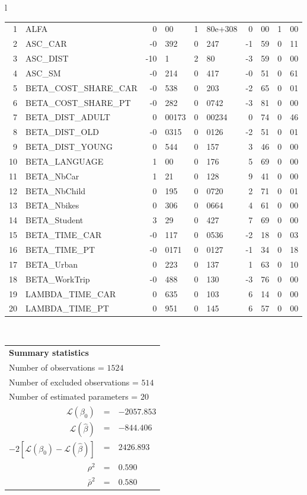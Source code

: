 \begin{tabular}{l}
\begin{tabular}{rlr@{.}lr@{.}lr@{.}lr@{.}l}
1 & ALFA & 0&00 & 1&80e+308 & 0&00 & 1&00\\
2 & ASC_CAR & -0&392 & 0&247 & -1&59 & 0&11\\
3 & ASC_DIST & -10&1 & 2&80 & -3&59 & 0&00\\
4 & ASC_SM & -0&214 & 0&417 & -0&51 & 0&61\\
5 & BETA_COST_SHARE_CAR & -0&538 & 0&203 & -2&65 & 0&01\\
6 & BETA_COST_SHARE_PT & -0&282 & 0&0742 & -3&81 & 0&00\\
7 & BETA_DIST_ADULT & 0&00173 & 0&00234 & 0&74 & 0&46\\
8 & BETA_DIST_OLD & -0&0315 & 0&0126 & -2&51 & 0&01\\
9 & BETA_DIST_YOUNG & 0&544 & 0&157 & 3&46 & 0&00\\
10 & BETA_LANGUAGE & 1&00 & 0&176 & 5&69 & 0&00\\
11 & BETA_NbCar & 1&21 & 0&128 & 9&41 & 0&00\\
12 & BETA_NbChild & 0&195 & 0&0720 & 2&71 & 0&01\\
13 & BETA_Nbikes & 0&306 & 0&0664 & 4&61 & 0&00\\
14 & BETA_Student & 3&29 & 0&427 & 7&69 & 0&00\\
15 & BETA_TIME_CAR & -0&117 & 0&0536 & -2&18 & 0&03\\
16 & BETA_TIME_PT & -0&0171 & 0&0127 & -1&34 & 0&18\\
17 & BETA_Urban & 0&223 & 0&137 & 1&63 & 0&10\\
18 & BETA_WorkTrip & -0&488 & 0&130 & -3&76 & 0&00\\
19 & LAMBDA_TIME_CAR & 0&635 & 0&103 & 6&14 & 0&00\\
20 & LAMBDA_TIME_PT & 0&951 & 0&145 & 6&57 & 0&00\\
\hline
\end{tabular}
\\
\begin{tabular}{rcl}
\multicolumn{3}{l}{\bf Summary statistics}\\
\multicolumn{3}{l}{ Number of observations = $1524$} \\
\multicolumn{3}{l}{ Number of excluded observations = $514$} \\
\multicolumn{3}{l}{ Number of estimated  parameters = $20$} \\
 $\mathcal{L}(\beta_0)$ &=&  $-2057.853$ \\
 $\mathcal{L}(\hat{\beta})$ &=& $-844.406 $  \\
 $-2[\mathcal{L}(\beta_0) -\mathcal{L}(\hat{\beta})]$ &=& $2426.893$ \\
    $\rho^2$ &=&   $0.590$ \\
    $\bar{\rho}^2$ &=&    $0.580$ \\
\end{tabular}
  \end{tabular}
